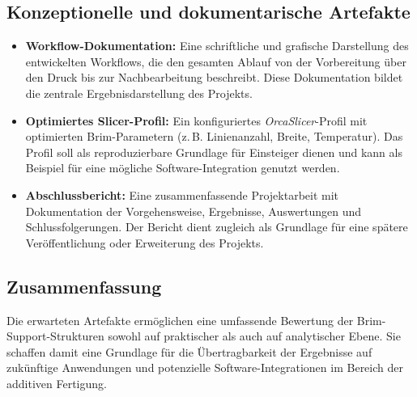 \subsection{Konzeptionelle und dokumentarische Artefakte}

\begin{itemize}
  \item \textbf{Workflow-Dokumentation:} 
  Eine schriftliche und grafische Darstellung des entwickelten Workflows, die den gesamten Ablauf von der Vorbereitung über den Druck bis zur Nachbearbeitung beschreibt.  
  Diese Dokumentation bildet die zentrale Ergebnisdarstellung des Projekts.
  
  \item \textbf{Optimiertes Slicer-Profil:} 
  Ein konfiguriertes \textit{OrcaSlicer}-Profil mit optimierten Brim-Parametern (z.\,B. Linienanzahl, Breite, Temperatur).  
  Das Profil soll als reproduzierbare Grundlage für Einsteiger dienen und kann als Beispiel für eine mögliche Software-Integration genutzt werden.
  
  \item \textbf{Abschlussbericht:} 
  Eine zusammenfassende Projektarbeit mit Dokumentation der Vorgehensweise, Ergebnisse, Auswertungen und Schlussfolgerungen.  
  Der Bericht dient zugleich als Grundlage für eine spätere Veröffentlichung oder Erweiterung des Projekts.
\end{itemize}

\subsection{Zusammenfassung}

Die erwarteten Artefakte ermöglichen eine umfassende Bewertung der Brim-Support-Strukturen sowohl auf praktischer als auch auf analytischer Ebene.  
Sie schaffen damit eine Grundlage für die Übertragbarkeit der Ergebnisse auf zukünftige Anwendungen und potenzielle Software-Integrationen im Bereich der additiven Fertigung.
